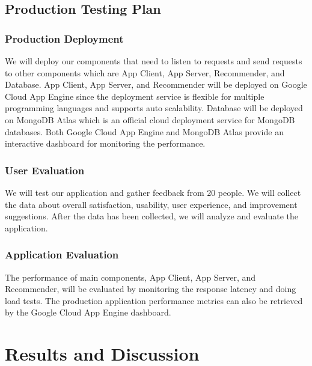 \documentclass[12pt,oneside,openright,a4paper]{cpe-english-project}
\begin{document}
\section{Production Testing Plan}

\subsection{Production Deployment}

We will deploy our components that need to listen to requests and send requests to other components which are App Client, App Server, Recommender, and Database. App Client, App Server, and Recommender will be deployed on Google Cloud App Engine since the deployment service is flexible for multiple programming languages and supports auto scalability. Database will be deployed on MongoDB Atlas which is an official cloud deployment service for MongoDB databases. Both Google Cloud App Engine and MongoDB Atlas provide an interactive dashboard for monitoring the performance.

\subsection{User Evaluation}

We will test our application and gather feedback from 20 people. We will collect the data about overall satisfaction, usability, user experience, and improvement suggestions. After the data has been collected, we will analyze and evaluate the application.

\subsection{Application Evaluation}

The performance of main components, App Client, App Server, and Recommender, will be evaluated by monitoring the response latency and doing load tests. The production application performance metrics can also be retrieved by the Google Cloud App Engine dashboard.


\chapter{Results and Discussion}
\end{document}
